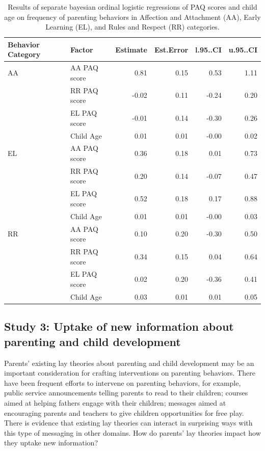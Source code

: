 \documentclass[floatsintext,man]{apa6}
\theoremstyle{definition}
\theoremstyle{definition}
\theoremstyle{definition}
\theoremstyle{remark}
\begin{document}
\begin{table}[h]
\centering
\begin{tabular}{llrrrr}
 Behavior Category & Factor & Estimate & Est.Error & l.95..CI & u.95..CI \\ 
  \hline
AA & AA PAQ score & 0.81 & 0.15 & 0.53 & 1.11 \\ 
   & RR PAQ score & -0.02 & 0.11 & -0.24 & 0.20 \\ 
   & EL PAQ score & -0.01 & 0.14 & -0.30 & 0.26 \\ 
   & Child Age & 0.01 & 0.01 & -0.00 & 0.02 \\ 
   \hline
EL & AA PAQ score & 0.36 & 0.18 & 0.01 & 0.73 \\ 
   & RR PAQ score & 0.20 & 0.14 & -0.07 & 0.47 \\ 
   & EL PAQ score & 0.52 & 0.18 & 0.17 & 0.88 \\ 
   & Child Age & 0.01 & 0.01 & -0.00 & 0.03 \\ 
   \hline
RR & AA PAQ score & 0.10 & 0.20 & -0.30 & 0.50 \\ 
   & RR PAQ score & 0.34 & 0.15 & 0.04 & 0.64 \\ 
   & EL PAQ score & 0.02 & 0.20 & -0.36 & 0.41 \\ 
   & Child Age & 0.03 & 0.01 & 0.01 & 0.05 \\ 
  \end{tabular}
\caption{Results of separate bayesian ordinal logistic regressions of PAQ scores and child age on frequency of parenting behaviors in Affection and Attachment (AA), Early Learning (EL), and Rules and Respect (RR) categories.} 
\end{table}

\subsection{Study 3: Uptake of new information about parenting and child
development}\label{study-3-uptake-of-new-information-about-parenting-and-child-development}

Parents' existing lay theories about parenting and child development may
be an important consideration for crafting interventions on parenting
behaviors. There have been frequent efforts to intervene on parenting
behaviors, for example, public service announcements telling parents to
read to their children; courses aimed at helping fathers engage with
their children; messages aimed at encouraging parents and teachers to
give children opportunities for free play. There is evidence that
existing lay theories can interact in surprising ways with this type of
messaging in other domains. How do parents' lay theories impact how they
uptake new information?
\end{document}
